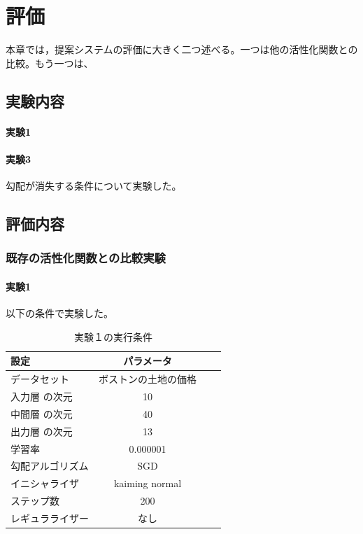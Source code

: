 \chapter{評価}
\label{evaluation}
本章では，提案システムの評価に大きく二つ述べる。一つは他の活性化関数との比較。もう一つは、

\section{実験内容}
\subsubsection{実験1}

\subsubsection{実験3}
勾配が消失する条件について実験した。




\section{評価内容}



\subsection{既存の活性化関数との比較実験}



\subsubsection{実験1}

以下の条件で実験した。

\begin{table}[htbp]
    \begin{center}
        \caption{実験１の実行条件}
        \vspace{5mm} 
        \begin{tabular}{l*{2}{c}r}
        設定              & パラメータ \\
        \hline
        データセット            & ボストンの土地の価格 \\
        入力層 の次元            & 10 \\
        中間層 の次元            & 40 \\
        出力層 の次元            & 13 \\
        学習率              & 0.000001 \\
        勾配アルゴリズム       & SGD \\
        イニシャライザ               & kaiming normal \\
        ステップ数        & 200 \\
        レギュラライザー           & なし \\
        \end{tabular}
    \end{center}
\end{table}


